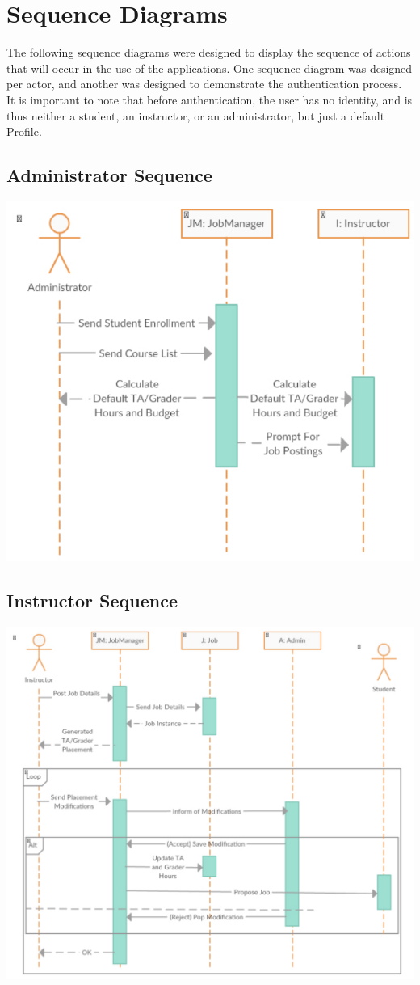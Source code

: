 \documentclass[12pt]{report}
\begin{document}
\chapter{Sequence Diagrams}
The following sequence diagrams were designed to display the sequence of actions that will occur in
the use of the applications. One sequence diagram was designed per actor, and another was designed
to demonstrate the authentication process. It is important to note that before authentication, the
user has no identity, and is thus neither a student, an instructor, or an administrator, but just a
default Profile.

\section{Administrator Sequence}
\includegraphics[scale=1.0]{model/Diagrams/Sequence/SeqAdmin}
\section{Instructor Sequence}
\includegraphics[scale=0.9]{model/Diagrams/Sequence/SeqInstructor}
\end{document}
